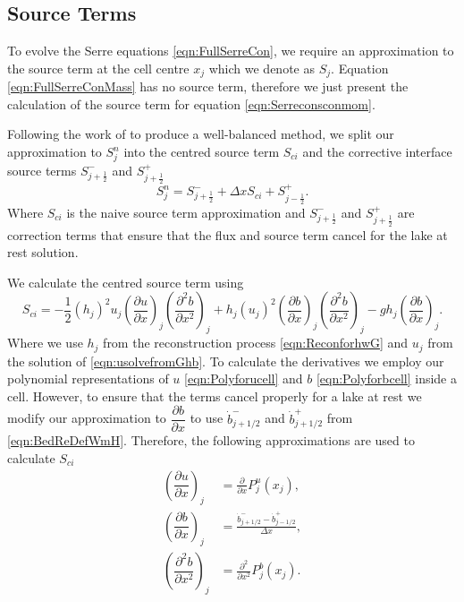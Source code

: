\subsection{Source Terms}
To evolve the Serre equations \eqref{eqn:FullSerreCon}, we require an approximation to the source term at the cell centre $x_j$ which we denote as $S_j$. Equation \eqref{eqn:FullSerreConMass} has no source term, therefore we just present the calculation of the source term for equation \eqref{eqn:Serreconsconmom}.

Following the work of \citet{Klein-etal-2004-2050} to produce a well-balanced method, we split our approximation to $S^n_j$ into the centred source term $S_{ci}$ and the corrective interface source terms $S^{-}_{j + \frac{1}{2}}$ and $S^{+}_{j + \frac{1}{2}}$
\begin{equation*}
S^n_j =  S^{-}_{j + \frac{1}{2}} + \Delta x S_{ci} + S^{+}_{j - \frac{1}{2}}.
\end{equation*}
Where $S_{ci}$ is the naive source term approximation and $S^{-}_{j + \frac{1}{2}}$ and $S^{+}_{j + \frac{1}{2}}$ are correction terms that ensure that the flux and source term cancel for the lake at rest solution. 

We calculate the centred source term using
\begin{equation*}
 S_{ci} = -\frac{1}{2}\left(h_j\right)^2 {u_j}\left( \frac{\partial {u}}{\partial x} \right)_j \left(\frac{\partial^2 b}{\partial x^2} \right)_j  + h_j \left(u_j\right)^2 \left(\frac{\partial b}{\partial x}\right)_j \left(\frac{\partial^2 b}{\partial x^2}\right)_j - gh_j\left(\frac{\partial b}{\partial x}\right)_j.
\end{equation*}
Where we use $h_j$ from the reconstruction process \eqref{eqn:ReconforhwG} and $u_j$ from the solution of \eqref{eqn:usolvefromGhb}. To calculate the derivatives we employ our polynomial representations of $u$ \eqref{eqn:Polyforucell} and $b$ \eqref{eqn:Polyforbcell} inside a cell. However, to ensure that the terms cancel properly for a lake at rest we modify our approximation to $\dfrac{\partial b}{\partial x}$ to use $\dot{b}^-_{j+1/2}$ and $\dot{b}^+_{j+1/2}$ from \eqref{eqn:BedReDefWmH}. Therefore, the following approximations are used to calculate $S_{ci}$
	\begin{align*}
	\left(\dfrac{\partial {u}}{\partial x} \right)_{j} &= \frac{\partial }{\partial x}P^u_j(x_{j}),  \\
\left(\dfrac{\partial {b}}{\partial x} \right)_{j} &=  \frac{\dot{b}^-_{j+1/2} - \dot{b}^+_{j-1/2}}{\Delta x} , \\	
	\left(\dfrac{\partial^2 {b}}{\partial x^2} \right)_{j} &= \frac{\partial^2 }{\partial x^2}P^b_j(x_{j}).
	\end{align*}


